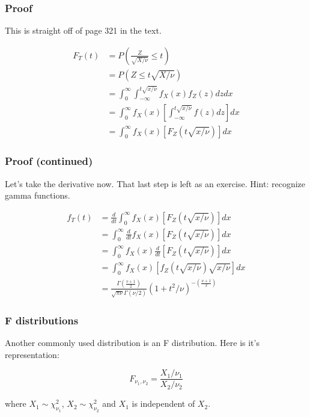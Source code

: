 \documentclass{beamer}
\begin{document}
\begin{frame}
\frametitle{Proof}

This is straight off of page 321 in the text. 

\begin{align*}
F_T(t) &= P\left( \frac{Z}{\sqrt{X/\nu}} \le t \right) \\
&= P\left( Z \le t\sqrt{X/\nu} \right) \\
&= \int_{0}^{\infty} \int_{-\infty}^{t \sqrt{x / \nu}} f_X(x) f_Z(z) dz dx \\
&= \int_{0}^{\infty} f_X(x) \left[ \int_{-\infty}^{t \sqrt{x / \nu}} f(z) dz \right]  dx \\
&= \int_{0}^{\infty} f_X(x) \left[ F_Z(t \sqrt{x / \nu}) \right]  dx
\end{align*}

\end{frame}

\begin{frame}
\frametitle{Proof (continued)}

Let's take the derivative now. That last step is left as an exercise. Hint: recognize gamma functions. 

\begin{align*}
f_T(t) &= \frac{d}{dt} \int_{0}^{\infty} f_X(x) \left[ F_Z(t \sqrt{x / \nu}) \right]  dx \\
&= \int_{0}^{\infty} \frac{d}{dt}  f_X(x) \left[ F_Z(t \sqrt{x / \nu}) \right]  dx \\
&= \int_{0}^{\infty} f_X(x) \frac{d}{dt} \left[ F_Z(t \sqrt{x / \nu}) \right]  dx \\
&= \int_{0}^{\infty} f_X(x) \left[ f_Z(t \sqrt{x / \nu}) \sqrt{x / \nu} \right]  dx \\
&= \frac{   \Gamma\left( \frac{v+1}{2} \right)   }{  \sqrt{\pi \nu } \Gamma(\nu / 2)   } \left( 1 + t^2/\nu \right)^{-(\frac{\nu + 1 }{2})}
\end{align*}
\end{frame}



\begin{frame}
\frametitle{F distributions}

Another commonly used distribution is an F distribution. Here is it's representation:

\[
F_{\nu_1, \nu_2} = \frac{X_1 / \nu_1 }{X_2 / \nu_2 }
\]

where $X_1 \sim \chi^2_{\nu_1}$,  $X_2 \sim \chi^2_{\nu_2}$ and $X_1$ is independent of $X_2$.

\end{frame}
\end{document}
